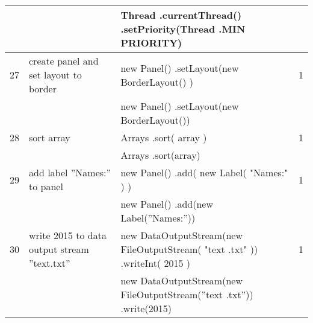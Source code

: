 \begin{longtable}{|p{}|p{}|p{}|p{}|}
		\rowcolor[HTML]{9AFF99} 
		&                                                        & Thread .currentThread() .setPriority(Thread .MIN PRIORITY)                                                       &                                         \\ \hline
		\rowcolor[HTML]{FFCCC9} 
		27                                & create panel and set layout to border                  & new Panel()  .setLayout(new BorderLayout() )                                                                     & 1                                       \\ \hline
		\rowcolor[HTML]{9AFF99} 
		&                                                        & new Panel() .setLayout(new BorderLayout())                                                                       &                                         \\ \hline
		\rowcolor[HTML]{FFCCC9} 
		28                                & sort array                                             & Arrays .sort( array )                                                                                            & 1                                       \\ \hline
		\rowcolor[HTML]{9AFF99} 
		&                                                        & Arrays .sort(array)                                                                                              &                                         \\ \hline
		\rowcolor[HTML]{FFCCC9} 
		29                                & add label ”Names:” to panel                            & new Panel() .add( new Label( "Names:" ) )                                                                        & 1                                       \\ \hline
		\rowcolor[HTML]{9AFF99} 
		&                                                        & new Panel() .add(new Label(”Names:”))                                                                            &                                         \\ \hline
		\rowcolor[HTML]{FFCCC9} 
		30                                & write 2015 to data output stream ”text.txt”            & new DataOutputStream(new FileOutputStream( "text .txt" ))  .writeInt( 2015 )                                     & 1                                       \\ \hline
		\rowcolor[HTML]{9AFF99} 
		&                                                        & new DataOutputStream(new FileOutputStream(”text .txt”)) .write(2015)                                             &                                         \\ \hline

\end{longtable}
